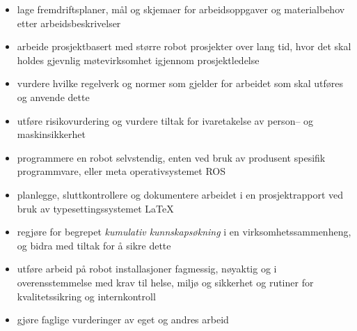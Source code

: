     \begin{itemize}
        \item lage fremdriftsplaner, mål og skjemaer for arbeidsoppgaver og materialbehov etter arbeidsbeskrivelser
        \item arbeide prosjektbasert med større robot prosjekter over lang tid, hvor det skal holdes gjevnlig møtevirksomhet igjennom prosjektledelse
        \item vurdere hvilke regelverk og normer som gjelder for arbeidet som skal utføres og anvende dette
        \item utføre risikovurdering og vurdere tiltak for ivaretakelse av person– og maskinsikkerhet
        \item programmere en robot selvstendig, enten ved bruk av produsent spesifik programmvare, eller meta operativsystemet ROS
        \item planlegge, sluttkontrollere og dokumentere arbeidet i en prosjektrapport ved bruk av typesettingssystemet LaTeX
        \item regjøre for begrepet \emph{kumulativ kunnskapsøkning} i en virksomhetssammenheng, og bidra med tiltak for å sikre dette
        \item utføre arbeid på robot installasjoner fagmessig, nøyaktig og i overensstemmelse med krav til helse, miljø og sikkerhet og rutiner for kvalitetssikring og internkontroll
        \item gjøre faglige vurderinger av eget og andres arbeid
    \end{itemize}
